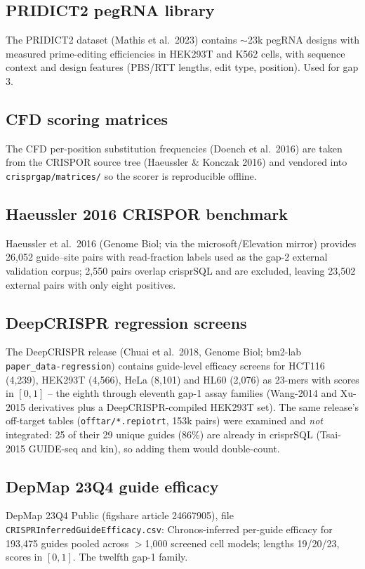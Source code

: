 \subsection{PRIDICT2 pegRNA library}
The PRIDICT2 dataset (Mathis et al.\ 2023) contains ${\sim}$23k pegRNA
designs with measured prime-editing efficiencies in HEK293T and K562
cells, with sequence context and design features (PBS/RTT lengths,
edit type, position). Used for gap 3.

\subsection{CFD scoring matrices}
The CFD per-position substitution frequencies (Doench et al.\ 2016) are
taken from the CRISPOR source tree (Haeussler \& Konczak 2016) and
vendored into \texttt{crisprgap/matrices/} so the scorer is reproducible
offline.

\subsection{Haeussler 2016 CRISPOR benchmark}
Haeussler et al.\ 2016 (Genome Biol; via the microsoft/Elevation mirror)
provides 26{,}052 guide--site pairs with read-fraction labels used as the
gap-2 external validation corpus; 2{,}550 pairs overlap crisprSQL and are
excluded, leaving 23{,}502 external pairs with only eight positives.

\subsection{DeepCRISPR regression screens}
The DeepCRISPR release (Chuai et al.\ 2018, Genome Biol; bm2-lab
\texttt{paper\_data-regression}) contains guide-level efficacy screens for
HCT116 (4{,}239), HEK293T (4{,}566), HeLa (8{,}101) and HL60 (2{,}076)
as 23-mers with scores in $[0,1]$ -- the eighth through eleventh gap-1
assay families (Wang-2014 and Xu-2015 derivatives plus a
DeepCRISPR-compiled HEK293T set). The same release's off-target tables
(\texttt{offtar/*.repiotrt}, 153k pairs) were examined and \emph{not}
integrated: 25 of their 29 unique guides (86\%) are already in crisprSQL
(Tsai-2015 GUIDE-seq and kin), so adding them would double-count.

\subsection{DepMap 23Q4 guide efficacy}
DepMap 23Q4 Public (figshare article 24667905), file
\texttt{CRISPRInferredGuideEfficacy.csv}: Chronos-inferred per-guide
efficacy for 193{,}475 guides pooled across $>$1{,}000 screened cell
models; lengths 19/20/23, scores in $[0,1]$. The twelfth gap-1 family.

